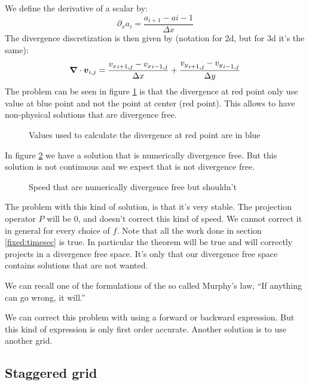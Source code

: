 We define the derivative of a scalar by:
\begin{equation}
  \partial_x a_i=\frac{a_{i+1}-a{i-1}}{\Delta x}
\end{equation}
The divergence discretization is then given by (notation for 2d, but for 3d it's the same):
\begin{equation}
  {\boldsymbol {\nabla}} \cdot {\boldsymbol {v}}_{i,j}=\frac{{v_{x}}_{i+1,j}-{v_{x}}_{i-1,j}}{\Delta x}+\frac{{v_{y}}_{i+1,j}-{v_{y}}_{i-1,j}}{\Delta y}
\end{equation}
The problem can be seen in figure \ref{fixed:unstaggered_div} is that the divergence at red point only use value at blue point and not the point at center (red point).
This allows to have non-physical solutions that are divergence free.

\begin{figure}
\caption{Values used to calculate the divergence at red point are in blue}
\label{fixed:unstaggered_div}
\end{figure}

In figure \ref{fixed:unstaggered_div2} we have a solution that is numerically divergence free.
But this solution is not continuous and we expect that is not divergence free.

\begin{figure}
\caption{Speed that are numerically divergence free but shouldn't}
\label{fixed:unstaggered_div2}
\end{figure}

The problem with this kind of solution, is that it's very stable.
The projection operator $P$ will be 0, and doesn't correct this kind of speed. We cannot correct it in general for every choice of $f$.
Note that all the work done in section \ref{fixed:timesec} is true. In particular the theorem will be true and will correctly projects
in a divergence free space. It's only that our divergence free space contains solutions that are not wanted.

We can recall one of the formulations of the so called Murphy's law, ``If anything can go wrong, it will.''

We can correct this problem with using a forward or backward expression. But this kind of expression is only first order accurate.
Another solution is to use another grid.

\FloatBarrier
\subsection{Staggered grid}

